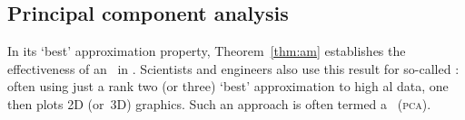 


\subsection{Principal component analysis}
\label{sec:pca}


In its `best' approximation property, Theorem~\ref{thm:am} establishes the effectiveness of an \svd\ in .
Scientists and engineers also use this result for so-called : often using just a rank two (or three) `best' approximation to high al data, one then plots 2D (or~3D) graphics.
Such an approach is often termed a ~(\textsc{pca}).

